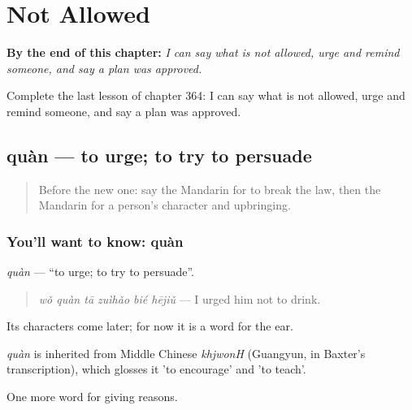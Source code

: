 
\chapter{Not Allowed}
\label{ch:zh-not-allowed}

\begin{chapteropening}
\textbf{By the end of this chapter:} \emph{I can say what is not allowed, urge and remind someone, and say a plan was approved.}

Complete the last lesson of chapter 364: I can say what is not allowed, urge and remind someone, and say a plan was approved.
\end{chapteropening}

\section[quàn]{quàn — to urge; to try to persuade}

\label{lesson:ZH-C364-quan}



\begin{quote}
Before the new one: say the Mandarin for to break the law, then the Mandarin for a person's character and upbringing.
\end{quote}

\subsection*{You'll want to know: quàn}
\emph{quàn} — \textquotedblleft{}to urge; to try to persuade\textquotedblright{}.

\begin{quote}
\emph{wǒ quàn tā zuìhǎo bié hējiǔ} — I urged him not to drink.
\end{quote}

Its characters come later; for now it is a word for the ear.

\begin{cousinweb}
\emph{quàn} is inherited from Middle Chinese \emph{khjwonH} (Guangyun, in Baxter's transcription), which glosses it 'to encourage' and 'to teach'.
\end{cousinweb}

\begin{grammarlens}[title={What you've built}]
One more word for giving reasons.
\end{grammarlens}

